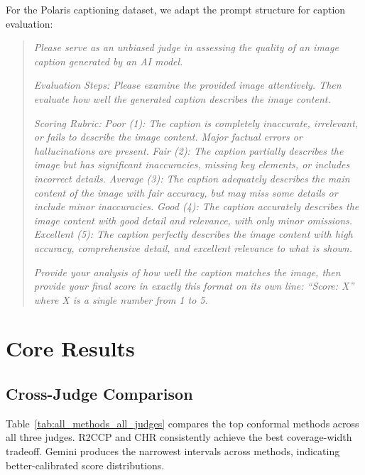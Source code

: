 \documentclass{article}
\begin{document}
For the Polaris captioning dataset, we adapt the prompt structure for caption evaluation:

\begin{quote}
\small
\textit{Please serve as an unbiased judge in assessing the quality of an image caption generated by an AI model.}

\textit{Evaluation Steps: Please examine the provided image attentively. Then evaluate how well the generated caption describes the image content.}

\textit{Scoring Rubric:}
\textit{Poor (1): The caption is completely inaccurate, irrelevant, or fails to describe the image content. Major factual errors or hallucinations are present.}
\textit{Fair (2): The caption partially describes the image but has significant inaccuracies, missing key elements, or includes incorrect details.}
\textit{Average (3): The caption adequately describes the main content of the image with fair accuracy, but may miss some details or include minor inaccuracies.}
\textit{Good (4): The caption accurately describes the image content with good detail and relevance, with only minor omissions.}
\textit{Excellent (5): The caption perfectly describes the image content with high accuracy, comprehensive detail, and excellent relevance to what is shown.}

\textit{Provide your analysis of how well the caption matches the image, then provide your final score in exactly this format on its own line: ``Score: X'' where X is a single number from 1 to 5.}
\end{quote}

\section{Core Results}

\subsection{Cross-Judge Comparison}
\label{app:all_methods}

Table~\ref{tab:all_methods_all_judges} compares the top conformal methods across all three judges. R2CCP and CHR consistently achieve the best coverage-width tradeoff. Gemini produces the narrowest intervals across methods, indicating better-calibrated score distributions.
\end{document}
